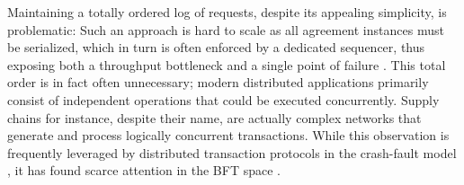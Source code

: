 \iffalse



\fs{people have been building the abstraction of a total order on top of a physical total order, i.e. the implementation mirrors abstraction. They KNOW that total order is limiting, its not a new idea or mistaken belief. The question is, whether it is possible to do it differently - we want to instead provide a different implementation. And people HAVE tried: But only for crash failure - or, only via sharding }

\fs{alternative version in comments}
\fi
\iffalse
Maintaining a totally ordered log of requests, despite its appealing simplicity, is problematic:
Such an approach is hard to scale  as all agreement instances must be serialized, which in turn is often enforced by a dedicated sequencer, thus exposing both a throughput bottleneck and a single point of failure . This total order is in fact often unnecessary; modern distributed applications primarily consist of independent operations that could be executed concurrently. Supply chains for instance, despite their name, are actually complex networks that generate and process logically concurrent transactions. 
While this observation is frequently leveraged by distributed transaction protocols in the crash-fault model \cite{a bunch}, it has found scarce \cite{Clairvoyant} attention in the BFT space .


